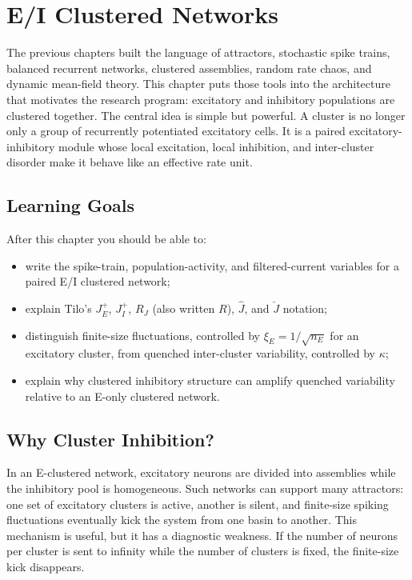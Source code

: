 \chapter{E/I Clustered Networks}
\label{ch:ei-clustered-networks}

The previous chapters built the language of attractors, stochastic spike trains,
balanced recurrent networks, clustered assemblies, random rate chaos, and
dynamic mean-field theory. This chapter puts those tools into the architecture
that motivates the research program: excitatory and inhibitory populations are
clustered together. The central idea is simple but powerful. A cluster is no
longer only a group of recurrently potentiated excitatory cells. It is a paired
excitatory-inhibitory module whose local excitation, local inhibition, and
inter-cluster disorder make it behave like an effective rate unit.

\section*{Learning Goals}

After this chapter you should be able to:
\begin{itemize}
    \item write the spike-train, population-activity, and filtered-current
    variables for a paired E/I clustered network;
    \item explain Tilo's \(J_E^+\), \(J_I^+\), \(R_J\) (also written \(R\)),
    \(\widehat J\), and \(\check J\) notation;
    \item distinguish finite-size fluctuations, controlled by
    \(\xi_E=1/\sqrt{n_E}\) for an excitatory cluster, from quenched
    inter-cluster variability, controlled by \(\kappa\);
    \item explain why clustered inhibitory structure can amplify quenched
    variability relative to an E-only clustered network.
\end{itemize}

\section{Why Cluster Inhibition?}
\label{sec:ch08-why-cluster-inhibition}

In an E-clustered network, excitatory neurons are divided into assemblies while
the inhibitory pool is homogeneous. Such networks can support many attractors:
one set of excitatory clusters is active, another is silent, and finite-size
spiking fluctuations eventually kick the system from one basin to another. This
mechanism is useful, but it has a diagnostic weakness. If the number of neurons
per cluster is sent to infinity while the number of clusters is fixed, the
finite-size kick disappears.

